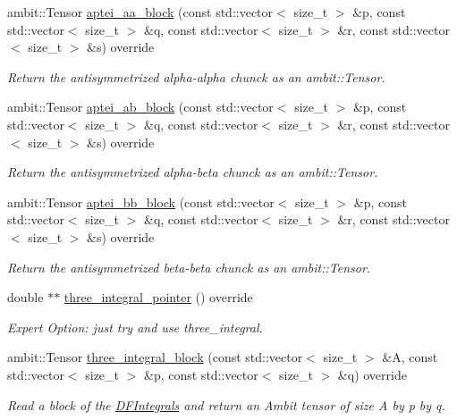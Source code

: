 \begin{DoxyCompactItemize}
ambit\+::\+Tensor \mbox{\hyperlink{classforte_1_1_d_i_s_k_d_f_integrals_a2709b0116f0e44fc1eb8038a2b7afd54}{aptei\+\_\+aa\+\_\+block}} (const std\+::vector$<$ size\+\_\+t $>$ \&p, const std\+::vector$<$ size\+\_\+t $>$ \&q, const std\+::vector$<$ size\+\_\+t $>$ \&r, const std\+::vector$<$ size\+\_\+t $>$ \&s) override
\begin{DoxyCompactList}\small\item\em Return the antisymmetrized alpha-\/alpha chunck as an ambit\+::\+Tensor. \end{DoxyCompactList}\item 
ambit\+::\+Tensor \mbox{\hyperlink{classforte_1_1_d_i_s_k_d_f_integrals_a3512219937aa98d2f0b6ee680254317a}{aptei\+\_\+ab\+\_\+block}} (const std\+::vector$<$ size\+\_\+t $>$ \&p, const std\+::vector$<$ size\+\_\+t $>$ \&q, const std\+::vector$<$ size\+\_\+t $>$ \&r, const std\+::vector$<$ size\+\_\+t $>$ \&s) override
\begin{DoxyCompactList}\small\item\em Return the antisymmetrized alpha-\/beta chunck as an ambit\+::\+Tensor. \end{DoxyCompactList}\item 
ambit\+::\+Tensor \mbox{\hyperlink{classforte_1_1_d_i_s_k_d_f_integrals_a4b78b82f7bb76de677a476d5982e9f89}{aptei\+\_\+bb\+\_\+block}} (const std\+::vector$<$ size\+\_\+t $>$ \&p, const std\+::vector$<$ size\+\_\+t $>$ \&q, const std\+::vector$<$ size\+\_\+t $>$ \&r, const std\+::vector$<$ size\+\_\+t $>$ \&s) override
\begin{DoxyCompactList}\small\item\em Return the antisymmetrized beta-\/beta chunck as an ambit\+::\+Tensor. \end{DoxyCompactList}\item 
double $\ast$$\ast$ \mbox{\hyperlink{classforte_1_1_d_i_s_k_d_f_integrals_a43f80b9c9e3b67223a11049c3e2f52e2}{three\+\_\+integral\+\_\+pointer}} () override
\begin{DoxyCompactList}\small\item\em Expert Option\+: just try and use three\+\_\+integral. \end{DoxyCompactList}\item 
ambit\+::\+Tensor \mbox{\hyperlink{classforte_1_1_d_i_s_k_d_f_integrals_aa36e8484286f58bcb2b57a7c8fb08a36}{three\+\_\+integral\+\_\+block}} (const std\+::vector$<$ size\+\_\+t $>$ \&A, const std\+::vector$<$ size\+\_\+t $>$ \&p, const std\+::vector$<$ size\+\_\+t $>$ \&q) override
\begin{DoxyCompactList}\small\item\em Read a block of the \mbox{\hyperlink{classforte_1_1_d_f_integrals}{D\+F\+Integrals}} and return an Ambit tensor of size A by p by q. \end{DoxyCompactList}\item 
$$
\end{DoxyCompactItemize}
